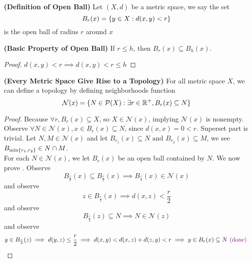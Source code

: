 \documentclass{report}
\begin{document}
\begin{definition}
\label{2.7.3}
\textbf{(Definition of Open Ball)} Let $(X,d)$ be a metric space, we say the set
\begin{equation}
B_r(x)=\{ y \in X: d(x,y)<r \}
\end{equation}
is the open ball of radius $r$ around  $x$
\end{definition}
\begin{theorem}
\label{2.7.4}
\textbf{(Basic Property of Open Ball)} If $r\leq h$, then  $B_r(x)\subseteq B_h(x)$.
\end{theorem}
\begin{proof}
$d(x,y)<r\implies d(x,y)<r\leq h$
\end{proof}
\begin{theorem}
\label{2.7.5}
\textbf{(Every Metric Space Give Rise to a Topology)}
For all metric space $X$, we can define a topology by defining neighborhoods function
 \begin{equation}
\mathcal{N}(x)=\{ N\in \mathcal{P}(X):\exists r\in\mathbb{R}^+, B_r(x)\subseteq N \}
\end{equation}
\end{theorem}
\begin{proof}
  Because $\forall r,B_r(x)\subseteq X$, so $X\in \mathcal{N}(x)$, implying $\mathcal{N}(x)$ is nonempty. Observe $\forall N \in \mathcal{N}(x), x \in B_r(x) \subseteq N$, since $d(x,x)=0<r$. Superset part is trivial. Let $N,M \in\mathcal{N}(x)$ and let $B_{r_1}(x)\subseteq N\text{ and }B_{r_2}(x)\subseteq M$, we see $B_{\min \{ r_1,r_2 \}}\in N\cap M$.\\ 


For each $N\in\mathcal{N}(x)$, we let $B_r(x)$ be an open ball contained by $N$. We now prove . Observe
\begin{equation}
B_{\frac{r}{2}}(x)\subseteq B_{\frac{r}{2}}(x)\implies B_{\frac{r}{2}}(x)\in \mathcal{N}(x)
\end{equation}
and observe 
\begin{equation}
z\in B_{\frac{r}{2}}(x)\implies d(x,z)<\frac{r}{2}
\end{equation}
and observe  
\begin{equation}
B_{\frac{r}{2}}(z)\subseteq N\implies N \in \mathcal{N}(z)
\end{equation}
and observe 
\begin{equation}
y\in B_{\frac{r}{2}}(z)\implies d(y,z)\leq \frac{r}{2}\implies d(x,y)<d(x,z)+d(z,y)<r\implies y\in B_r(x)\subseteq N\textcolor{violet}{\text{ (done) }}
\end{equation}
\end{proof}
\end{document}
